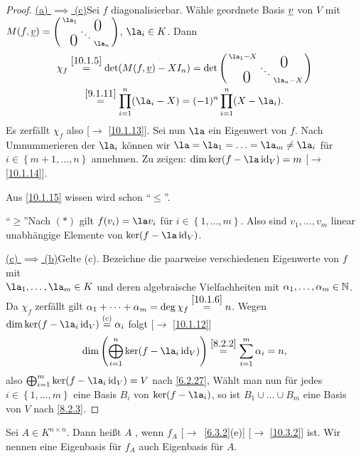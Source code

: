 \documentclass[../../main.tex]{subfiles}
\begin{document}
\begin{proof}
\underline{(a) $\implies$ (c)}\quad Sei $f$ diagonalisierbar. Wähle geordnete Basis ${\underline v}$ von $V$ mit $M(f,\v) = \left(\begin{smallmatrix}
\la_1 & & \llap{$\overset{\blap{\LARGE 0}}{~}$} \\
& \ddots &\\
\rlap{\tlap{\LARGE 0}} & & \la_n
\end{smallmatrix}\right)$, $\la_i\in K$. Dann 
\begin{multline*}
\chi_f\overset{\ref{10.1.5}}{=}\det (M(f,\v)- X I_n) = \det\left(\begin{smallmatrix}
\la_1-X & & \llap{$\overset{\blap{\LARGE 0}}{~}$} \\
& \ddots &\\
\rlap{\tlap{\LARGE 0}} & & \la_n-X
\end{smallmatrix}\right)\\
\overset{\ref{9.1.11}}{=}\prod_{i = 1}^{n}(\la_i - X) = (-1)^n\prod_{i = 1}^{n}(X-\la_i).
\end{multline*}
Es zerfällt $\chi_f$ also [$\to$ \ref{10.1.13}]. Sei nun $\la$ ein Eigenwert von $f$. Nach Umnummerieren der $\la_i$ können wir $\la = \la_1 = \ldots = \la_m\ne \la_i$ für $i\in \left\{m+1,\ldots,n\right\}$ annehmen. Zu zeigen: $\dim \ker(f-\la \id_V) = m$ [$\to$ \ref{10.1.14}].

Aus \ref{10.1.15} wissen wird schon "`$\le$"'. 

"`$\ge$"'\quad Nach $(*)$ gilt $f(v_i) = \la v_i$ für $i\in \left\{1,\ldots,m\right\}$. Also sind $v_1,\ldots,v_m$ linear unabhängige Elemente von $\ker(f-\la \id_V)$.

\underline{(c) $\implies$ (b)}\quad Gelte (c). Bezeichne die paarweise verschiedenen Eigenwerte von $f$ mit\\
$\la_1,\ldots,\la_m\in K$ und deren algebraische Vielfachheiten mit $\alpha_1,\ldots,\alpha_m\in \mathbb N$. Da $\chi_f$ zerfällt gilt $\alpha_1+\dots + \alpha_m = \deg \chi_f \overset{\ref{10.1.6}}{=} n$. Wegen $\dim \ker(f-\la_i\id_V) \overset{\text{(c)}}{=}\alpha_i$ folgt [$\to$ \ref{10.1.12}] $$\dim\left(\bigoplus_{i= 1}^n\ker(f-\la_i\id_V)\right) \overset{\ref{8.2.2}}{=} \sum_{i = 1}^{m}\alpha_i = n,$$
also $\bigoplus_{i = 1}^m\ker (f-\la_i\id_V) = V$ nach \ref{6.2.27}, Wählt man nun für jedes $i\in \left\{1,\ldots,m\right\}$ eine Basis $B_i$ von $\ker (f-\la_i)$, so ist $B_1\cup\ldots\cup B_m$ eine Basis von $V$ nach \ref{8.2.3}.
\end{proof}

\begin{df}\label{10.3.4}
Sei $A\in K^{n\times n}$. Dann heißt $A$ , wenn $f_A$ [$\to$~\ref{6.3.2}(e)]  [$\to$ \ref{10.3.2}] ist. Wir nennen eine Eigenbasis für $f_A$ auch Eigenbasis für $A$.
\end{df}
\end{document}
